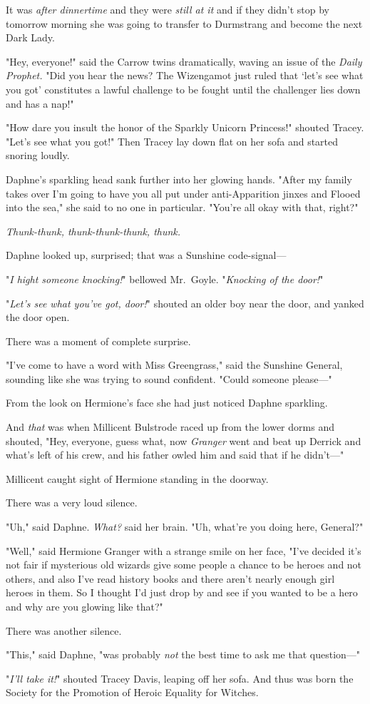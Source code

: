 It was \emph{after dinnertime} and they were \emph{still at it} and if they
didn't stop by tomorrow morning she was going to transfer to Durmstrang and
become the next Dark Lady.

"Hey, everyone!" said the Carrow twins dramatically, waving an issue of the
\emph{Daily Prophet.} "Did you hear the news? The Wizengamot just ruled that
`let's see what you got' constitutes a lawful challenge to be fought until the
challenger lies down and has a nap!"

"How dare you insult the honor of the Sparkly Unicorn Princess!" shouted
Tracey. "Let's see what you got!" Then Tracey lay down flat on her sofa and
started snoring loudly.

Daphne's sparkling head sank further into her glowing hands. "After my family
takes over I'm going to have you all put under anti-Apparition jinxes and
Flooed into the sea," she said to no one in particular. "You're all okay with
that, right?"

\emph{Thunk-thunk, thunk-thunk-thunk, thunk.}

Daphne looked up, surprised; that was a Sunshine code-signal---

"\emph{I hight someone knocking!}" bellowed Mr.~Goyle. "\emph{Knocking of the
door!}"

"\emph{Let's see what you've got, door!}" shouted an older boy near the door,
and yanked the door open.

There was a moment of complete surprise.

"I've come to have a word with Miss Greengrass," said the Sunshine General,
sounding like she was trying to sound confident. "Could someone please---"

From the look on Hermione's face she had just noticed Daphne sparkling.

And \emph{that} was when Millicent Bulstrode raced up from the lower dorms and
shouted, "Hey, everyone, guess what, now \emph{Granger} went and beat up
Derrick and what's left of his crew, and his father owled him and said that if
he didn't---"

Millicent caught sight of Hermione standing in the doorway.

There was a very loud silence.

"Uh," said Daphne. \emph{What?} said her brain. "Uh, what're you doing here,
General?"

"Well," said Hermione Granger with a strange smile on her face, "I've decided
it's not fair if mysterious old wizards give some people a chance to be heroes
and not others, and also I've read history books and there aren't nearly enough
girl heroes in them. So I thought I'd just drop by and see if you wanted to be
a hero and why are you glowing like that?"

There was another silence.

"This," said Daphne, "was probably \emph{not} the best time to ask me that
question---"

"\emph{I'll take it!}" shouted Tracey Davis, leaping off her sofa.
\sbreak
And thus was born the Society for the Promotion of Heroic Equality for Witches.
